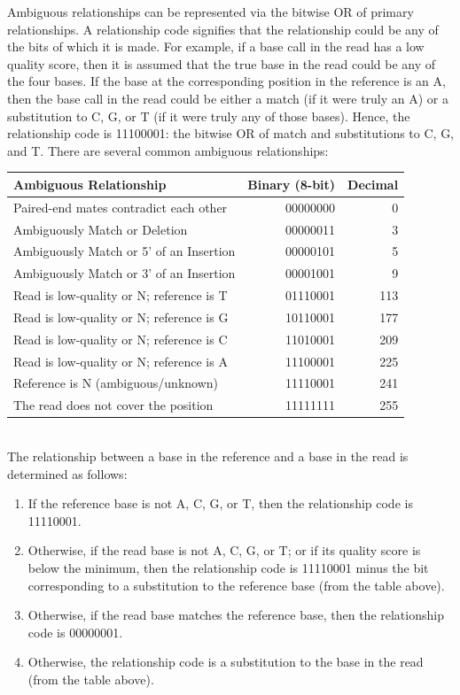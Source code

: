 \documentclass{article}
\begin{document}
Ambiguous relationships can be represented via the bitwise OR of primary relationships.
A relationship code signifies that the relationship could be any of the bits of which it is made.
For example, if a base call in the read has a low quality score, then it is assumed that the true base in the read could be any of the four bases.
If the base at the corresponding position in the reference is an A, then the base call in the read could be either a match (if it were truly an A) or a substitution to C, G, or T (if it were truly any of those bases).
Hence, the relationship code is 11100001: the bitwise OR of match and substitutions to C, G, and T.
There are several common ambiguous relationships: \\

\begin{tabular}{ l r r }
\hline
\textbf{Ambiguous Relationship} & \textbf{Binary (8-bit)} & \textbf{Decimal} \\
\hline
Paired-end mates contradict each other & 00000000 & 0 \\
Ambiguously Match or Deletion & 00000011 & 3 \\
Ambiguously Match or 5' of an Insertion & 00000101 & 5 \\
Ambiguously Match or 3' of an Insertion & 00001001 & 9 \\
Read is low-quality or N; reference is T & 01110001 & 113 \\
Read is low-quality or N; reference is G & 10110001 & 177 \\
Read is low-quality or N; reference is C & 11010001 & 209 \\
Read is low-quality or N; reference is A & 11100001 & 225 \\
Reference is N (ambiguous/unknown) & 11110001 & 241 \\
The read does not cover the position & 11111111 & 255 \\
\hline
\end{tabular} \\

The relationship between a base in the reference and a base in the read is determined as follows:
\begin{enumerate}
    \item If the reference base is not A, C, G, or T, then the relationship code is 11110001.
    \item Otherwise, if the read base is not A, C, G, or T; or if its quality score is below the minimum, then the relationship code is 11110001 minus the bit corresponding to a substitution to the reference base (from the table above).
    \item Otherwise, if the read base matches the reference base, then the relationship code is 00000001.
    \item Otherwise, the relationship code is a substitution to the base in the read (from the table above).
\end{enumerate}
\end{document}
